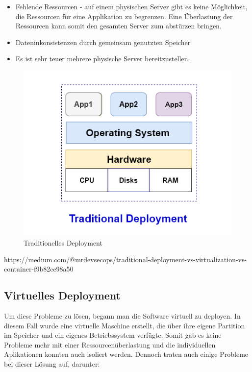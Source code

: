 \begin{itemize}
    \item Fehlende Ressourcen - auf einem physischen Server gibt es keine Möglichkeit, die Ressourcen für eine Applikation zu begrenzen. Eine Überlastung der Ressourcen kann somit den gesamten Server zum abstürzen bringen.
    \item Dateninkonsistenzen durch gemeinsam genutzten Speicher
    \item Es ist sehr teuer mehrere physische Server bereitzustellen.
\end{itemize}

\begin{figure}[h]
    \centering
    \includegraphics[width=0.8\linewidth]{pics/traditionelles-deployment.png}
    \caption{Traditionelles Deployment}
    \label{fig:enter-label}
\end{figure}



\cite{Verschiedene_Deployment_Arten}    
https://medium.com/@mrdevsecops/traditional-deployment-vs-virtualization-vs-container-f9b82ce98a50


\subsection{Virtuelles Deployment}
Um diese Probleme zu lösen, begann man die Software virtuell zu deployen. In diesem Fall wurde eine virtuelle Maschine erstellt, die über ihre eigene Partition im Speicher und ein eigenes Betriebssystem verfügte. Somit gab es keine Probleme mehr mit einer Ressourcenüberlastung und die individuellen Aplikationen konnten auch isoliert werden. Dennoch traten auch einige Probleme bei dieser Lösung auf, darunter:

